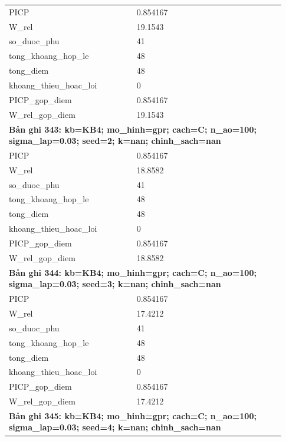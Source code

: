 \begin{longtable}{p{0.43\linewidth}p{0.50\linewidth}}
PICP & 0.854167 \\
W\_\allowbreak rel & 19.1543 \\
so\_\allowbreak duoc\_\allowbreak phu & 41 \\
tong\_\allowbreak khoang\_\allowbreak hop\_\allowbreak le & 48 \\
tong\_\allowbreak diem & 48 \\
khoang\_\allowbreak thieu\_\allowbreak hoac\_\allowbreak loi & 0 \\
PICP\_\allowbreak gop\_\allowbreak diem & 0.854167 \\
W\_\allowbreak rel\_\allowbreak gop\_\allowbreak diem & 19.1543 \\
\midrule
\multicolumn{2}{p{0.95\linewidth}}{\textbf{Bản ghi 343: kb=KB4; mo\_hinh=gpr; cach=C; n\_ao=100; sigma\_lap=0.03; seed=2; k=nan; chinh\_sach=nan}} \\
PICP & 0.854167 \\
W\_\allowbreak rel & 18.8582 \\
so\_\allowbreak duoc\_\allowbreak phu & 41 \\
tong\_\allowbreak khoang\_\allowbreak hop\_\allowbreak le & 48 \\
tong\_\allowbreak diem & 48 \\
khoang\_\allowbreak thieu\_\allowbreak hoac\_\allowbreak loi & 0 \\
PICP\_\allowbreak gop\_\allowbreak diem & 0.854167 \\
W\_\allowbreak rel\_\allowbreak gop\_\allowbreak diem & 18.8582 \\
\midrule
\multicolumn{2}{p{0.95\linewidth}}{\textbf{Bản ghi 344: kb=KB4; mo\_hinh=gpr; cach=C; n\_ao=100; sigma\_lap=0.03; seed=3; k=nan; chinh\_sach=nan}} \\
PICP & 0.854167 \\
W\_\allowbreak rel & 17.4212 \\
so\_\allowbreak duoc\_\allowbreak phu & 41 \\
tong\_\allowbreak khoang\_\allowbreak hop\_\allowbreak le & 48 \\
tong\_\allowbreak diem & 48 \\
khoang\_\allowbreak thieu\_\allowbreak hoac\_\allowbreak loi & 0 \\
PICP\_\allowbreak gop\_\allowbreak diem & 0.854167 \\
W\_\allowbreak rel\_\allowbreak gop\_\allowbreak diem & 17.4212 \\
\midrule
\multicolumn{2}{p{0.95\linewidth}}{\textbf{Bản ghi 345: kb=KB4; mo\_hinh=gpr; cach=C; n\_ao=100; sigma\_lap=0.03; seed=4; k=nan; chinh\_sach=nan}} \\

\end{longtable}
